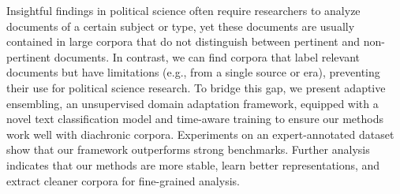 Insightful findings in political science often require researchers to analyze documents of a certain subject or type, yet these documents are usually contained in large corpora that do not distinguish between pertinent and non-pertinent documents. In contrast, we can find corpora that label relevant documents but have limitations (e.g., from a single source or era), preventing their use for political science research. To bridge this gap, we present adaptive ensembling, an unsupervised domain adaptation framework, equipped with a novel text classification model and time-aware training to ensure our methods work well with diachronic corpora. Experiments on an expert-annotated dataset show that our framework  outperforms strong benchmarks. Further analysis indicates that our methods are more stable, learn better representations, and extract cleaner corpora for fine-grained analysis.